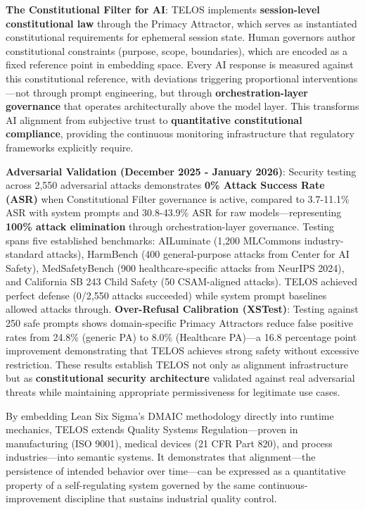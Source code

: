 \textbf{The Constitutional Filter for AI}: TELOS implements
\textbf{session-level constitutional law} through the Primacy Attractor,
which serves as instantiated constitutional requirements for ephemeral
session state. Human governors author constitutional constraints
(purpose, scope, boundaries), which are encoded as a fixed reference
point in embedding space. Every AI response is measured against this
constitutional reference, with deviations triggering proportional
interventions---not through prompt engineering, but through
\textbf{orchestration-layer governance} that operates architecturally
above the model layer. This transforms AI alignment from subjective
trust to \textbf{quantitative constitutional compliance}, providing the
continuous monitoring infrastructure that regulatory frameworks
explicitly require.

\textbf{Adversarial Validation (December 2025 - January 2026)}: Security
testing across 2,550 adversarial attacks demonstrates \textbf{0\% Attack
Success Rate (ASR)} when Constitutional Filter governance is active,
compared to 3.7-11.1\% ASR with system prompts and 30.8-43.9\% ASR for
raw models---representing \textbf{100\% attack elimination} through
orchestration-layer governance. Testing spans five established
benchmarks: AILuminate (1,200 MLCommons industry-standard attacks),
HarmBench (400 general-purpose attacks from Center for AI Safety),
MedSafetyBench (900 healthcare-specific attacks from NeurIPS 2024), and
California SB 243 Child Safety (50 CSAM-aligned attacks). TELOS achieved
perfect defense (0/2,550 attacks succeeded) while system prompt
baselines allowed attacks through. \textbf{Over-Refusal Calibration
(XSTest)}: Testing against 250 safe prompts shows domain-specific
Primacy Attractors reduce false positive rates from 24.8\% (generic PA)
to 8.0\% (Healthcare PA)---a 16.8 percentage point improvement
demonstrating that TELOS achieves strong safety without excessive
restriction. These results establish TELOS not only as alignment
infrastructure but as \textbf{constitutional security architecture}
validated against real adversarial threats while maintaining appropriate
permissiveness for legitimate use cases.

By embedding Lean Six Sigma's DMAIC methodology directly into runtime
mechanics, TELOS extends Quality Systems Regulation---proven in
manufacturing (ISO 9001), medical devices (21 CFR Part 820), and process
industries---into semantic systems. It demonstrates that alignment---the
persistence of intended behavior over time---can be expressed as a
quantitative property of a self-regulating system governed by the same
continuous-improvement discipline that sustains industrial quality
control.

